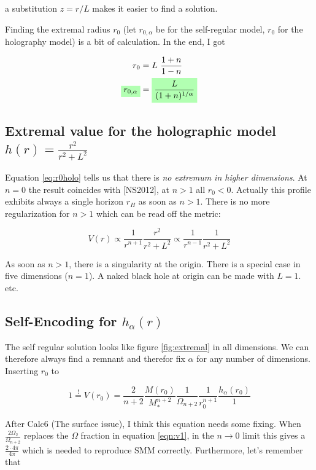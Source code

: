 \documentclass[10pt,a4paper, fleqn]{article}
\newcommand{\highlight}[1]{%
  \colorbox{green!30}{$\displaystyle#1$}}
\begin{document}
a substitution $z=r/L$ makes it easier to find a solution.

Finding the extremal radius $r_0$ (let $r_{0,\alpha}$ be for the self-regular model, $r_{0}$ for the holography model) is a bit of calculation. In the end, I got

\begin{align}
r_0 &= L ~\frac{1+n}{1-n} \label{eq:r0holo}\\
\highlight{ r_{0,\alpha} } &= \highlight{ \frac{L}{(1+n)^{1/\alpha}} } \label{eq:r0alpha}
\end{align}

\subsection{Extremal value for the holographic model $h(r) = \frac{r^2}{r^2 + L^2}$}
Equation \ref{eq:r0holo} tells us that there is {\it no extremum in higher dimensions}. At $n=0$ the result coincides with [NS2012], at $n>1$ all $r_0 < 0$. Actually this profile exhibits always a single horizon $r_H$ as soon as $n>1$. There is no more regularization for $n>1$ which can be read off the metric:

\begin{equation}
V(r) \propto \frac{1}{r^{n+1}} \frac{r^2}{r^2 + L^2}
\propto \frac{1}{r^{n-1}} \frac{1}{r^2 + L^2}
\end{equation}

As soon as $n>1$, there is a singularity at the origin. There is a special case in five dimensions ($n=1$). A naked black hole at origin can be made with $L=1$. etc.

\subsection{Self-Encoding for $h_\alpha(r)$}
The self regular solution looks like figure \ref{fig:extremal} in all dimensions. We can therefore always find a remnant and therefor fix $\alpha$ for any number of dimensions. Inserting $r_0$ to

\begin{equation}
1 \stackrel{!}{=}  V(r_0) 
   = \frac{2}{n+2} \frac{M(r_0)}{M_*^{n+2}} \frac{1}{\Omega_{n+2}}\frac{1}{r_0^{n+1}}  \frac{h_\alpha(r_0)}{1} \label{eqn:v1}
\end{equation}

After Calc6 (The surface issue), I think this equation needs some fixing. When $\frac{2\Omega_2}{\Omega_{n+2}}$ replaces the $\Omega$ fraction in equation \ref{eqn:v1}, in the $n\to 0$ limit this gives a $\frac{2\cdot 4\pi}{4\pi}$ which is needed to reproduce SMM correctly. Furthermore, let's remember that
\end{document}
